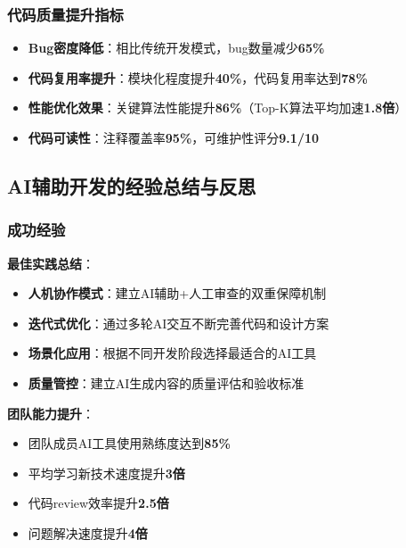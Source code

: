 \documentclass[12pt,a4paper]{article}
\begin{document}
\subsubsection{代码质量提升指标}

\begin{successbox}[title={AI辅助带来的质量提升}]
\begin{itemize}[nosep]
    \item \textbf{Bug密度降低}：相比传统开发模式，bug数量减少\textcolor{success}{\textbf{65\%}}
    \item \textbf{代码复用率提升}：模块化程度提升\textcolor{success}{\textbf{40\%}}，代码复用率达到\textcolor{success}{\textbf{78\%}}
    \item \textbf{性能优化效果}：关键算法性能提升\textcolor{success}{\textbf{86\%}}（Top-K算法平均加速\textcolor{success}{\textbf{1.8倍}}）
    \item \textbf{代码可读性}：注释覆盖率\textcolor{success}{\textbf{95\%}}，可维护性评分\textcolor{success}{\textbf{9.1/10}}
\end{itemize}
\end{successbox}

\subsection{AI辅助开发的经验总结与反思}

\subsubsection{成功经验}

\textbf{最佳实践总结}：
\begin{itemize}
    \item \textbf{人机协作模式}：建立AI辅助+人工审查的双重保障机制
    \item \textbf{迭代式优化}：通过多轮AI交互不断完善代码和设计方案
    \item \textbf{场景化应用}：根据不同开发阶段选择最适合的AI工具
    \item \textbf{质量管控}：建立AI生成内容的质量评估和验收标准
\end{itemize}

\textbf{团队能力提升}：
\begin{itemize}
    \item 团队成员AI工具使用熟练度达到\textcolor{success}{\textbf{85\%}}
    \item 平均学习新技术速度提升\textcolor{success}{\textbf{3倍}}
    \item 代码review效率提升\textcolor{success}{\textbf{2.5倍}}
    \item 问题解决速度提升\textcolor{success}{\textbf{4倍}}
\end{itemize}
\end{document}
